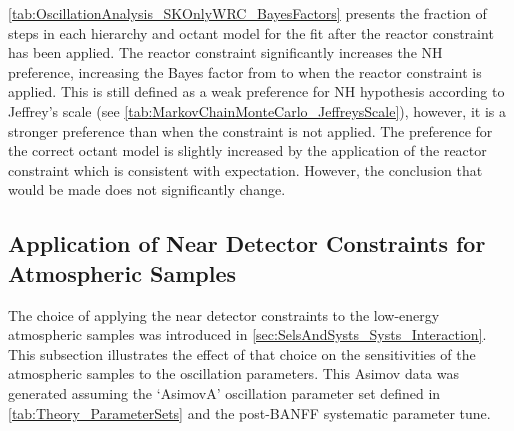 \autoref{tab:OscillationAnalysis_SKOnlyWRC_BayesFactors} presents the fraction of steps in each hierarchy and octant model for the fit after the reactor constraint has been applied. The reactor constraint significantly increases the NH preference, increasing the Bayes factor from  to  when the reactor constraint is applied. This is still defined as a weak preference for NH hypothesis according to Jeffrey's scale (see \autoref{tab:MarkovChainMonteCarlo_JeffreysScale}), however, it is a stronger preference than when the constraint is not applied. The preference for the correct octant model is slightly increased by the application of the reactor constraint which is consistent with expectation. However, the conclusion that would be made does not significantly change. 


\clearpage
\subsection{Application of Near Detector Constraints for Atmospheric Samples}
\label{sec:OscillationAnalysis_SKOnly_NoND}

The choice of applying the near detector constraints to the low-energy atmospheric samples was introduced in \autoref{sec:SelsAndSysts_Systs_Interaction}. This subsection illustrates the effect of that choice on the sensitivities of the atmospheric samples to the oscillation parameters. This Asimov data was generated assuming the `AsimovA' oscillation parameter set defined in \autoref{tab:Theory_ParameterSets} and the post-BANFF systematic parameter tune.

